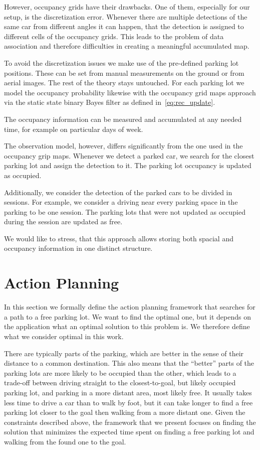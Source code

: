However, occupancy grids have their drawbacks. One of them, especially for our
setup, is the discretization error. Whenever there are multiple detections of
the same car from different angles it can happen, that the detection is
assigned to different cells of the occupancy grids. This leads to the problem
of data association and therefore difficulties in creating a meaningful
accumulated map.

To avoid the discretization issues we make use of the pre-defined parking lot
positions. These can be set from manual measurements on the ground or from
aerial images. The rest of the theory stays untouched. For each parking lot we
model the occupancy probability likewise with the occupancy grid maps approach
via the static state binary Bayes filter as defined in~\eqref{eq:rec_update}.

The occupancy information can be measured and accumulated at any needed time,
for example on particular days of week.

The observation model, however, differs significantly from the one used in the
occupancy grip maps. Whenever we detect a parked car, we search for the
closest parking lot and assign the detection to it. The parking lot occupancy
is updated as occupied.

Additionally, we consider the detection of the parked cars to be divided in
sessions. For example, we consider a driving near every parking space in the
parking to be one session. The parking lots that were not updated as occupied
during the session are updated as free.

We would like to stress, that this approach allows storing both spacial and
occupancy information in one distinct structure.


\section{Action Planning} %
\label{sec:action_planning}

In this section we formally define the action planning framework that searches
for a path to a free parking lot. We want to find the optimal one, but it
depends on the application what an optimal solution to this problem is. We
therefore define what we consider optimal in this work.

There are typically parts of the parking, which are better in the sense of
their distance to a common destination. This also means that the ``better''
parts of the parking lots are more likely to be occupied than the other, which
leads to a trade-off between driving straight to the closest-to-goal, but
likely occupied parking lot, and parking in a more distant area, most likely
free. It usually takes less time to drive a car than to walk by foot, but it
can take longer to find a free parking lot closer to the goal then walking
from a more distant one. Given the constraints described above, the framework
that we present focuses on finding the solution that minimizes the expected
time spent on finding a free parking lot and walking from the found one to the
goal.

